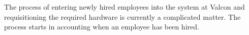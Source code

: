 The process of entering newly hired employees into the system at Valcon 
and requisitioning the required hardware is currently a complicated matter.
The process starts in accounting when an employee has been hired.
